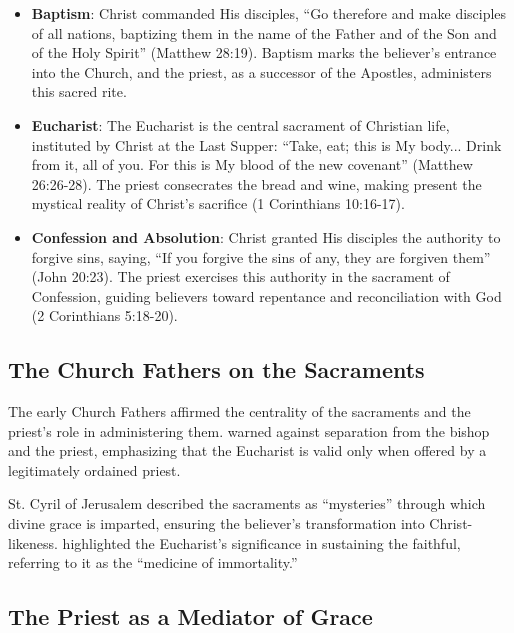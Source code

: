 \documentclass[12pt,doc]{apa7}   	%
\begin{document}
\begin{itemize}
    \item \textbf{Baptism}: Christ commanded His disciples, ``Go therefore and make disciples of all nations, baptizing them in the name of the Father and of the Son and of the Holy Spirit'' (Matthew 28:19). Baptism marks the believer’s entrance into the Church, and the priest, as a successor of the Apostles, administers this sacred rite.
    
    \item \textbf{Eucharist}: The Eucharist is the central sacrament of Christian life, instituted by Christ at the Last Supper: ``Take, eat; this is My body... Drink from it, all of you. For this is My blood of the new covenant'' (Matthew 26:26-28). The priest consecrates the bread and wine, making present the mystical reality of Christ’s sacrifice (1 Corinthians 10:16-17).

    \item \textbf{Confession and Absolution}: Christ granted His disciples the authority to forgive sins, saying, ``If you forgive the sins of any, they are forgiven them'' (John 20:23). The priest exercises this authority in the sacrament of Confession, guiding believers toward repentance and reconciliation with God (2 Corinthians 5:18-20).
\end{itemize}

\subsection{The Church Fathers on the Sacraments}

The early Church Fathers affirmed the centrality of the sacraments and the priest’s role in administering them. \cite{epistles_ignatius} warned against separation from the bishop and the priest, emphasizing that the Eucharist is valid only when offered by a legitimately ordained priest. 

St. Cyril of Jerusalem \citep{grube_church_fathers} described the sacraments as ``mysteries'' through which divine grace is imparted, ensuring the believer’s transformation into Christ-likeness. \citet{priesthood_chrysostom} highlighted the Eucharist’s significance in sustaining the faithful, referring to it as the ``medicine of immortality.''

\subsection{The Priest as a Mediator of Grace}
\end{document}
